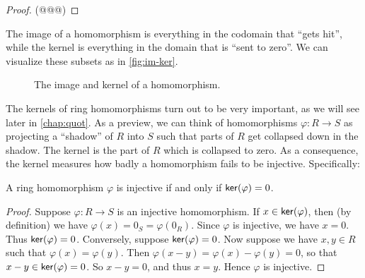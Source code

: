 \begin{proof}
(@@@)
\end{proof}

The image of a homomorphism is everything in the codomain that ``gets hit'', while the kernel is everything in the domain that is ``sent to zero''. We can visualize these subsets as in \autoref{fig:im-ker}.

\begin{figure}[h!]
\begin{center}
\caption{The image and kernel of a homomorphism. \label{fig:im-ker}}
\end{center}
\end{figure}

The kernels of ring homomorphisms turn out to be very important, as we will see later in \autoref{chap:quot}. As a preview, we can think of homomorphisms \(\varphi : R \rightarrow S\) as projecting a ``shadow'' of \(R\) into \(S\) such that parts of \(R\) get collapsed down in the shadow. The kernel is the part of \(R\) which is collapsed to zero. As a consequence, the kernel measures how badly a homomorphism fails to be injective. Specifically:

\begin{prop} \label{prop:ker-zero}
A ring homomorphism \(\varphi\) is injective if and only if \( \mathsf{ker}(\varphi)  = 0\).
\end{prop}

\begin{proof}
Suppose \(\varphi : R \rightarrow S\) is an injective homomorphism. If \(x \in  \mathsf{ker}(\varphi) \), then (by definition) we have \(\varphi(x) = 0_S = \varphi(0_R)\). Since \(\varphi\) is injective, we have \(x = 0\). Thus \( \mathsf{ker}(\varphi)  = 0\). Conversely, suppose \( \mathsf{ker}(\varphi)  = 0\). Now suppose we have \(x,y \in R\) such that \(\varphi(x) = \varphi(y)\). Then \(\varphi(x - y) = \varphi(x) - \varphi(y) = 0\), so that \(x-y \in  \mathsf{ker}(\varphi)  = 0\). So \(x-y = 0\), and thus \(x = y\). Hence \(\varphi\) is injective.
\end{proof}

